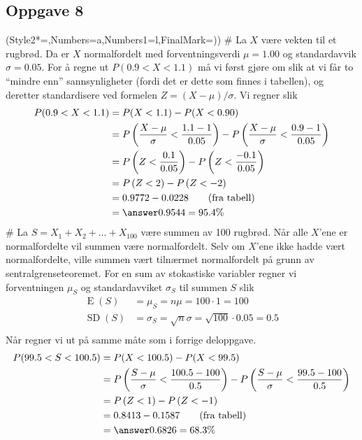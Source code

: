 \subsection*{Oppgave 8}
\begin{easylist}[enumerate]
	\ListProperties(Style2*=,Numbers=a,Numbers1=l,FinalMark={)})
	# La $X$ være vekten til et rugbrød.
	Da er $X$ normalfordelt med forventningsverdi $\mu = 1.00$ og standardavvik $\sigma = 0.05$.
	For å regne ut $P(0.9 < X < 1.1)$ må vi først gjøre om slik at vi får to ``mindre enn'' sannsynligheter (fordi det er dette som finnes i tabellen), og deretter standardisere ved formelen $Z = (X - \mu) / \sigma$.
	Vi regner slik
	\begin{align*}
		P(0.9 < X < 1.1) &= P(X < 1.1) - P(X < 0.90) \\
		&= P\left( \frac{X - \mu}{\sigma} <  \frac{1.1 - 1}{0.05} \right) -
		P\left( \frac{X - \mu}{\sigma} <  \frac{0.9 - 1}{0.05} \right) \\
		&= P\left( Z <  \frac{0.1}{0.05} \right) -
		P\left( Z <  \frac{-0.1}{0.05} \right) \\
		&= P\left( Z <  2 \right) -
		P\left( Z <  -2 \right) \\
		&= 0.9772 - 0.0228 \qquad (\text{fra tabell}) \\
		&= \answer{0.9544 = 95.4 \%}
	\end{align*}
	# La $S = X_1 + X_2 + \dots + X_{100}$ være summen av 100 rugbrød.
	Når alle $X$'ene er normalfordelte vil summen være normalfordelt.
	Selv om $X$'ene ikke hadde vært normalfordelte, ville summen vært tilnærmet normalfordelt på grunn av sentralgrenseteoremet.
	For en sum av stokastiske variabler regner vi forventningen $\mu_S$ og standardavviket $\sigma_S$ til summen $S$ slik
	\begin{align*}
		\operatorname{E}(S) &= \mu_S = n \mu = 100 \cdot 1 = 100 \\
		\operatorname{SD}(S) &= \sigma_S = \sqrt{n} \sigma = \sqrt{100} \cdot 0.05 = 0.5 \\
	\end{align*}
	Når regner vi ut på samme måte som i forrige deloppgave.
	\begin{align*}
		P(99.5 < S < 100.5) &= P(X < 100.5) - P(X < 99.5) \\
		&= P\left( \frac{S - \mu}{\sigma} <  \frac{100.5 - 100}{0.5} \right) -
		P\left( \frac{S - \mu}{\sigma} <  \frac{99.5 - 100}{0.5} \right) \\
		&= P\left( Z <  1 \right) -
		P\left( Z <  -1 \right) \\
		&= 0.8413 - 0.1587 \qquad (\text{fra tabell}) \\
		&= \answer{0.6826 = 68.3 \%}
	\end{align*}
\end{easylist}

